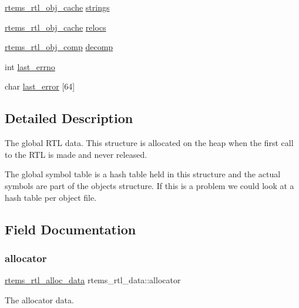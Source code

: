 \begin{DoxyCompactItemize}
\item 
\mbox{\hyperlink{structrtems__rtl__obj__cache}{rtems\+\_\+rtl\+\_\+obj\+\_\+cache}} \mbox{\hyperlink{structrtems__rtl__data_ad69f90b7ebe3ba71eeea4dcb32cc844b}{strings}}
\item 
\mbox{\hyperlink{structrtems__rtl__obj__cache}{rtems\+\_\+rtl\+\_\+obj\+\_\+cache}} \mbox{\hyperlink{structrtems__rtl__data_afa5791d308b1184d25c6f7362c352f80}{relocs}}
\item 
\mbox{\hyperlink{rtl-obj-comp_8h_a5ac76d7cdc14a520157bd5c8a322f56c}{rtems\+\_\+rtl\+\_\+obj\+\_\+comp}} \mbox{\hyperlink{structrtems__rtl__data_a7f1df4654d7be639be51d0db7d2cc3af}{decomp}}
\item 
int \mbox{\hyperlink{structrtems__rtl__data_ad1f26d947fd873cf89f697295db58e19}{last\+\_\+errno}}
\item 
char \mbox{\hyperlink{structrtems__rtl__data_a4dc4fe750b8cbee1542d5f467d5bbca8}{last\+\_\+error}} \mbox{[}64\mbox{]}
\end{DoxyCompactItemize}


\subsection{Detailed Description}
The global R\+TL data. This structure is allocated on the heap when the first call to the R\+TL is made and never released.

The global symbol table is a hash table held in this structure and the actual symbols are part of the object\textquotesingle{}s structure. If this is a problem we could look at a hash table per object file. 

\subsection{Field Documentation}
\mbox{\label{structrtems__rtl__data_ab52a733bfe03f01dfafd6fc88d2beea6}} 
\subsubsection{\texorpdfstring{allocator}{allocator}}
{\footnotesize\ttfamily \mbox{\hyperlink{structrtems__rtl__alloc__data}{rtems\+\_\+rtl\+\_\+alloc\+\_\+data}} rtems\+\_\+rtl\+\_\+data\+::allocator}

The allocator data. \mbox{\label{structrtems__rtl__data_a84accfc67887c355934fd018fdf3dcab}} 

